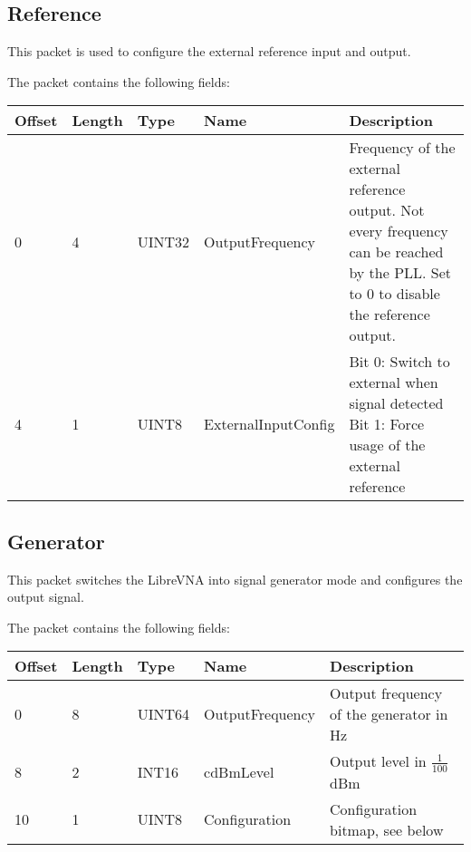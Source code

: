 \documentclass[a4paper,11pt]{article}
\begin{document}
\subsection{Reference}
This packet is used to configure the external reference input and output.

The packet contains the following fields:
\begin{ThreePartTable}
\setlength\tabcolsep{3pt}

\begin{longtable}{p{} |  p{}  |  p{}| p{} | p{}}
\toprule
\textbf{Offset} &\textbf{Length} &\textbf{Type} & \textbf{Name} &\textbf{Description} \\ 
\hline
\endhead
\midrule[\heavyrulewidth]
\endfoot  
\midrule[\heavyrulewidth]
\endlastfoot

0 & 4 & UINT32 & OutputFrequency & Frequency of the external reference output. Not every frequency can be reached by the PLL. Set to 0 to disable the reference output.\\
4 & 1 & UINT8 & ExternalInputConfig & \makecell[l]{Bit 0: Switch to external when signal detected\\Bit 1: Force usage of the external reference} \\
\end{longtable}   
\end{ThreePartTable}

\subsection{Generator}
This packet switches the LibreVNA into signal generator mode and configures the output signal.

The packet contains the following fields:
\begin{ThreePartTable}
\setlength\tabcolsep{3pt}

\begin{longtable}{p{} |  p{}  |  p{}| p{} | p{}}
\toprule
\textbf{Offset} &\textbf{Length} &\textbf{Type} & \textbf{Name} &\textbf{Description} \\ 
\hline
\endhead
\midrule[\heavyrulewidth]
\endfoot  
\midrule[\heavyrulewidth]
\endlastfoot

0 & 8 & UINT64 & OutputFrequency & Output frequency of the generator in Hz\\
8 & 2 & INT16 & cdBmLevel & Output level in $\frac{1}{100}$dBm \\
10 & 1 & UINT8 & Configuration & Configuration bitmap, see below \\
\end{longtable}   
\end{ThreePartTable}
\end{document}
